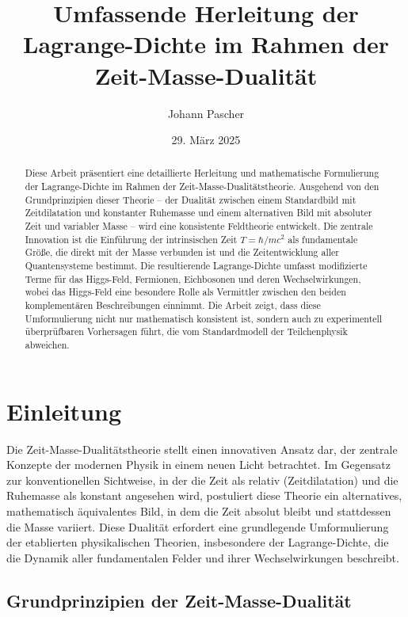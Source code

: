 \documentclass[a4paper,12pt]{article}
\begin{document}
	
	\title{Umfassende Herleitung der Lagrange-Dichte im Rahmen der Zeit-Masse-Dualität}
	\author{Johann Pascher}
	\date{29. März 2025}
	
	\maketitle
	
	\begin{abstract}
		Diese Arbeit präsentiert eine detaillierte Herleitung und mathematische Formulierung der Lagrange-Dichte im Rahmen der Zeit-Masse-Dualitätstheorie. Ausgehend von den Grundprinzipien dieser Theorie – der Dualität zwischen einem Standardbild mit Zeitdilatation und konstanter Ruhemasse und einem alternativen Bild mit absoluter Zeit und variabler Masse – wird eine konsistente Feldtheorie entwickelt. Die zentrale Innovation ist die Einführung der intrinsischen Zeit \( T = \hbar/mc^2 \) als fundamentale Größe, die direkt mit der Masse verbunden ist und die Zeitentwicklung aller Quantensysteme bestimmt. Die resultierende Lagrange-Dichte umfasst modifizierte Terme für das Higgs-Feld, Fermionen, Eichbosonen und deren Wechselwirkungen, wobei das Higgs-Feld eine besondere Rolle als Vermittler zwischen den beiden komplementären Beschreibungen einnimmt. Die Arbeit zeigt, dass diese Umformulierung nicht nur mathematisch konsistent ist, sondern auch zu experimentell überprüfbaren Vorhersagen führt, die vom Standardmodell der Teilchenphysik abweichen.
	\end{abstract}
	
	\tableofcontents
	\newpage
	
	\section{Einleitung}
	
	Die Zeit-Masse-Dualitätstheorie stellt einen innovativen Ansatz dar, der zentrale Konzepte der modernen Physik in einem neuen Licht betrachtet. Im Gegensatz zur konventionellen Sichtweise, in der die Zeit als relativ (Zeitdilatation) und die Ruhemasse als konstant angesehen wird, postuliert diese Theorie ein alternatives, mathematisch äquivalentes Bild, in dem die Zeit absolut bleibt und stattdessen die Masse variiert. Diese Dualität erfordert eine grundlegende Umformulierung der etablierten physikalischen Theorien, insbesondere der Lagrange-Dichte, die die Dynamik aller fundamentalen Felder und ihrer Wechselwirkungen beschreibt.
	
	\subsection{Grundprinzipien der Zeit-Masse-Dualität}
	
\end{document}
